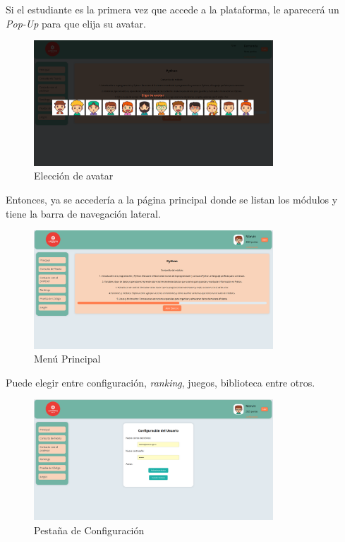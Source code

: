 \begin{appendices}
Si el estudiante es la primera vez que accede a la plataforma, le aparecerá un \textit{Pop-Up} para que elija su avatar.

\begin{figure}[H]
    \centering
    \includegraphics[width=0.8\textwidth]{imagenes/Manual/eleccion.png}
    \caption{Elección de avatar}
\end{figure}

Entonces, ya se accedería a la página principal donde se listan los módulos y tiene la barra de navegación lateral. 

\begin{figure}[H]
    \centering
    \includegraphics[width=0.8\textwidth]{imagenes/Manual/principal.png}
    \caption{Menú Principal}
\end{figure}

Puede elegir entre configuración, \textit{ranking}, juegos, biblioteca entre otros.

\begin{figure}[H]
    \centering
    \includegraphics[width=0.8\textwidth]{imagenes/Manual/configuracion.png}
    \caption{Pestaña de Configuración}
\end{figure}


\end{appendices}
